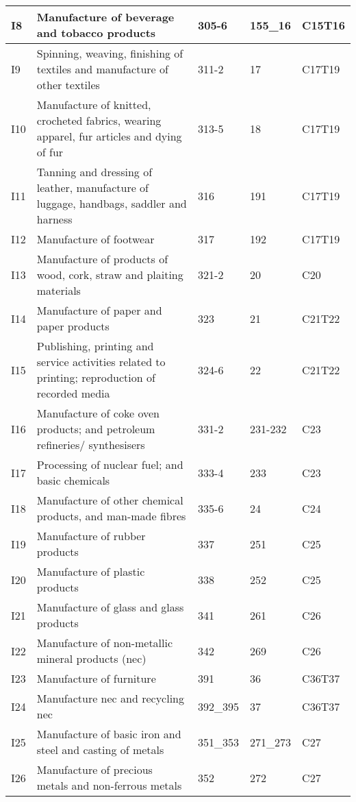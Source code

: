 \documentclass[12pt,english]{article}
\begin{document}
\begin{table}[ht]
\begin{adjustbox}{width=\textwidth}
\begin{tabular}{lp{500pt}lll}
		I8 & Manufacture of beverage and tobacco products & 305-6 & 155\_16 & C15T16 \\ \midrule
		I9 & Spinning, weaving, finishing of textiles and manufacture of other textiles & 311-2 & 17 & C17T19 \\ \midrule
		I10 & Manufacture of knitted, crocheted fabrics, wearing apparel, fur articles and dying of fur & 313-5 & 18 & C17T19 \\ \midrule
		I11 & Tanning and dressing of leather, manufacture of luggage, handbags, saddler and harness & 316 & 191 & C17T19 \\ \midrule
		I12 & Manufacture of footwear & 317 & 192 & C17T19 \\ \midrule
		I13 & Manufacture of products of wood, cork, straw and plaiting materials%
		& 321-2 & 20 & C20 \\ \midrule
		I14 & Manufacture of paper and paper products & 323 & 21 & C21T22 \\ \midrule
		I15 & Publishing, printing and service activities related to printing; reproduction of recorded media & 324-6 & 22 & C21T22 \\ \midrule
		I16 & Manufacture of coke oven products; and petroleum refineries/ synthesisers & 331-2 & 231-232 & C23 \\ \midrule
		I17 & Processing of nuclear fuel; and basic chemicals & 333-4 & 233 & C23 \\ \midrule
		I18 & Manufacture of other chemical products, and man-made fibres & 335-6 & 24 & C24 \\ \midrule
		I19 & Manufacture of rubber products & 337 & 251 & C25 \\ \midrule
		I20 & Manufacture of plastic products & 338 & 252 & C25 \\ \midrule
		I21 & Manufacture of glass and glass products & 341 & 261 & C26 \\ \midrule
		I22 & Manufacture of non-metallic mineral products (nec) & 342 & 269 & C26 \\ \midrule
		I23 & Manufacture of furniture & 391 & 36 & C36T37 \\ \midrule
		I24 & Manufacture nec and recycling nec & 392\_395 & 37 & C36T37 \\ \midrule
		I25 & Manufacture of basic iron and steel and casting of metals & 351\_353 & 271\_273 & C27 \\ \midrule
		I26 & Manufacture of precious metals and non-ferrous metals & 352 & 272 & C27 \\ \midrule

\end{tabular}
\end{adjustbox}
\end{table}
\end{document}
